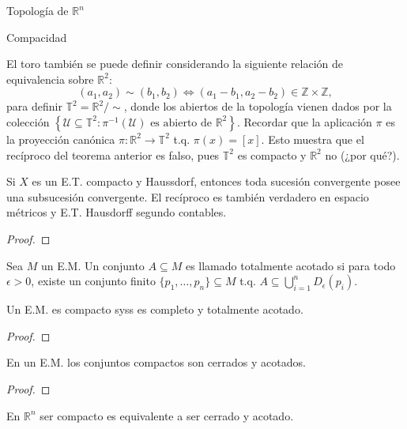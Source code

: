\begin{chapter}{Topología de $\mathbb{R}^n$}
\begin{section}{Compacidad}
\begin{rem}
El toro también se puede definir considerando la siguiente relación de equivalencia sobre $\mathbb{R}^2$: $$(a_1,a_2)\sim(b_1,b_2)\Leftrightarrow(a_1-b_1,a_2-b_2)\in\mathbb{Z}\times\mathbb{Z},$$ para definir $\mathbb{T}^2=\mathbb{R}^2/\sim$, donde los abiertos de la topología vienen dados por la colección $\left\lbrace\mathcal{U}\subseteq\mathbb{T}^2:\pi^{-1}\left(\mathcal{U}\right)\text{ es abierto de }\mathbb{R}^2\right\rbrace$. Recordar que la aplicación $\pi$ es la proyección canónica $\pi:\mathbb{R}^2\to\mathbb{T}^2$ t.q. $\pi(x)=[x]$. Esto muestra que el recíproco del teorema anterior es falso, pues $\mathbb{T}^2$ es compacto y $\mathbb{R}^2$ no (¿por qué?).
\end{rem}

\begin{them}
Si $X$ es un E.T. compacto y Haussdorf, entonces toda sucesión convergente posee una subsucesión convergente. El recíproco es también verdadero en espacio métricos y E.T. Hausdorff segundo contables. 
\end{them}

\begin{proof}

\end{proof}

\begin{defn}
Sea $M$ un E.M. Un conjunto $A\subseteq M$ es llamado totalmente acotado si para todo $\epsilon>0$, existe un conjunto finito $\{p_1,\ldots,p_n\}\subseteq M$ t.q. $A\subseteq\bigcup_{i=1}^nD_\epsilon(p_i)$.
\end{defn}

\begin{them}
Un E.M. es compacto syss es completo y totalmente acotado.
\end{them}

\begin{proof}

\end{proof}

\begin{them}
En un E.M. los conjuntos compactos son cerrados y acotados.
\end{them}

\begin{proof}

\end{proof}

\begin{them}
En $\mathbb{R}^n$ ser compacto es equivalente a ser cerrado y acotado. 
\end{them}


\end{section}
\end{chapter}

